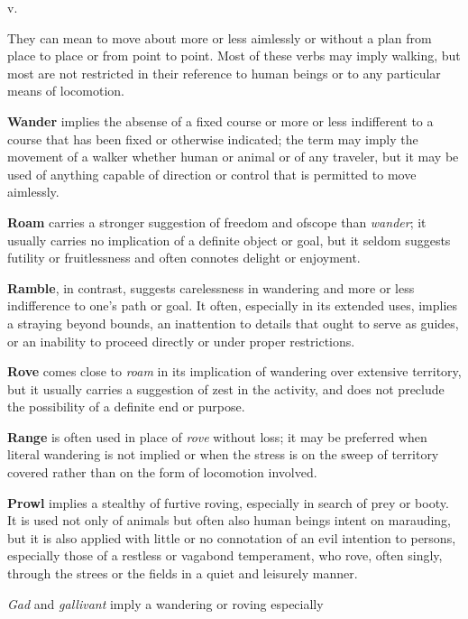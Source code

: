 \begin{description}[style=unboxed]
 v.
\begin{mynewitemize}
\item They can mean to move about more or less aimlessly or without a plan from
place to place or from point to point. Most of these verbs may imply walking,
but most are not restricted in their reference to human beings or to any
particular means of locomotion.
\item \textbf{Wander} implies the absense of a fixed course or more or less
indifferent to a course that has been fixed or otherwise indicated; the term may
imply the movement of a walker whether human or animal or of any traveler, but
it may be used of anything capable of direction or control that is permitted to
move aimlessly.
\item \textbf{Roam} carries a stronger suggestion of freedom and ofscope than
\textit{wander}; it usually carries no implication of a definite object or goal,
but it seldom suggests futility or fruitlessness and often connotes delight or
enjoyment.
\item \textbf{Ramble}, in contrast, suggests carelessness in wandering and more
or less indifference to one's path or goal. It often, especially in its extended
uses, implies a straying beyond bounds, an inattention to details that ought to
serve as guides, or an inability to proceed directly or under proper
restrictions.
\item \textbf{Rove} comes close to \textit{roam} in its implication of wandering
over extensive territory, but it usually carries a suggestion of zest in the
activity, and does not preclude the possibility of a definite end or purpose.
\item \textbf{Range} is often used in place of \textit{rove} without loss; it
may be preferred when literal wandering is not implied or when the stress is on
the sweep of territory covered rather than on the form of locomotion involved.
\item \textbf{Prowl} implies a stealthy of furtive roving, especially in search
of prey or booty. It is used not only of animals but often also human beings
intent on marauding, but it is also applied with little or no connotation of an
evil intention to persons, especially those of a restless or vagabond
temperament, who rove, often singly, through the strees or the fields in a quiet
and leisurely manner.
\item \textit{Gad} and \textit{gallivant} imply a wandering or roving especially

\end{mynewitemize}
\end{description}
